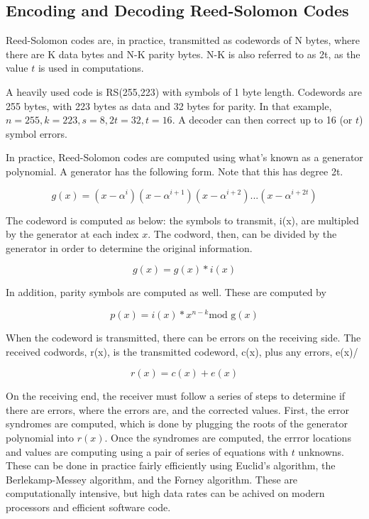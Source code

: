 \documentclass[12pt]{article}
\begin{document}
\subsection{Encoding and Decoding Reed-Solomon Codes}

Reed-Solomon codes are, in practice, transmitted as codewords of N bytes, where there are K data bytes and N-K parity bytes. N-K is also referred to as 2t, as the value $t$ is used in computations. 

A heavily used code is RS(255,223) with symbols of 1 byte length. Codewords are 255 bytes, with 223 bytes as data and 32 bytes for parity. In that example, $n= 255, k = 223, s = 8, 2t = 32, t = 16$. A decoder can then correct up to 16 (or $t$) symbol errors. 

In practice, Reed-Solomon codes are computed using what's known as a generator polynomial. A generator has the following form. Note that this has degree 2t. 

\begin{equation}
g(x) = (x-\alpha^i)(x-\alpha^{i+1})(x-\alpha^{i+2}) ... (x-\alpha^{i+2t})
\end{equation}

The codeword is computed as below: the symbols to transmit, i(x), are multipled by the generator at each index $x$. The codword, then, can be divided by the generator in order to determine the original information.

\begin{equation}
g(x) = g(x) * i(x)
\end{equation}

In addition, parity symbols are computed as well. These are computed by 

\begin{equation}
p(x) = i(x) * x^{n-k} \text{mod g}(x)
\end{equation}

When the codeword is transmitted, there can be errors on the receiving side. The received codwords, r(x), is the transmitted codeword, c(x), plus any errors, e(x)/

\begin{equation}
r(x) = c(x) + e(x)
\end{equation}

On the receiving end, the receiver must follow a series of steps to determine if there are errors, where the errors are, and the corrected values. First, the error syndromes are computed, which is done by plugging the roots of the generator polynomial into $r(x)$. Once the syndromes are computed, the errror locations and values are computing using a pair of series of equations with $t$ unknowns. These can be done in practice fairly efficiently using Euclid's algorithm, the Berlekamp-Messey algorithm, and the Forney algorithm. These are computationally intensive, but high data rates can be achived on modern processors and efficient software code. \cite{rsg}
\end{document}
